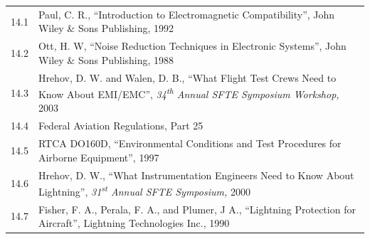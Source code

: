 \documentclass[
]{book}
\begin{document}
\begin{longtable}[]{@{}ll@{}}
\toprule
\endhead
\begin{minipage}[t]{0.06\columnwidth}\raggedright
14.1\strut
\end{minipage} & \begin{minipage}[t]{0.88\columnwidth}\raggedright
Paul, C. R., ``Introduction to Electromagnetic Compatibility'', John Wiley \& Sons Publishing, 1992\strut
\end{minipage}\tabularnewline
\begin{minipage}[t]{0.06\columnwidth}\raggedright
14.2\strut
\end{minipage} & \begin{minipage}[t]{0.88\columnwidth}\raggedright
Ott, H. W, ``Noise Reduction Techniques in Electronic Systems'', John Wiley \& Sons Publishing, 1988\strut
\end{minipage}\tabularnewline
\begin{minipage}[t]{0.06\columnwidth}\raggedright
14.3\strut
\end{minipage} & \begin{minipage}[t]{0.88\columnwidth}\raggedright
Hrehov, D. W. and Walen, D. B., ``What Flight Test Crews Need to Know About EMI/EMC'', \emph{34\textsuperscript{th} Annual SFTE Symposium Workshop,} 2003\strut
\end{minipage}\tabularnewline
\begin{minipage}[t]{0.06\columnwidth}\raggedright
14.4\strut
\end{minipage} & \begin{minipage}[t]{0.88\columnwidth}\raggedright
Federal Aviation Regulations, Part 25\strut
\end{minipage}\tabularnewline
\begin{minipage}[t]{0.06\columnwidth}\raggedright
14.5\strut
\end{minipage} & \begin{minipage}[t]{0.88\columnwidth}\raggedright
RTCA DO160D, ``Environmental Conditions and Test Procedures for Airborne Equipment'', 1997\strut
\end{minipage}\tabularnewline
\begin{minipage}[t]{0.06\columnwidth}\raggedright
14.6\strut
\end{minipage} & \begin{minipage}[t]{0.88\columnwidth}\raggedright
Hrehov, D. W., ``What Instrumentation Engineers Need to Know About Lightning'', \emph{31\textsuperscript{st} Annual SFTE Symposium,} 2000\strut
\end{minipage}\tabularnewline
\begin{minipage}[t]{0.06\columnwidth}\raggedright
14.7\strut
\end{minipage} & \begin{minipage}[t]{0.88\columnwidth}\raggedright
Fisher, F. A., Perala, F. A., and Plumer, J A., ``Lightning Protection for Aircraft'', Lightning Technologies Inc., 1990\strut
\end{minipage}\tabularnewline
\bottomrule
\end{longtable}
\end{document}
